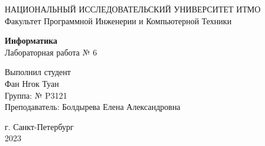 \pagestyle{main_title}  
\Large\begin{center}
    НАЦИОНАЛЬНЫЙ ИССЛЕДОВАТЕЛЬСКИЙ УНИВЕРСИТЕТ ИТМО \\
    Факультет Программной Инженерии и Компьютерной Техники
\end{center}
\vspace{250pt}
\begin{center}
\Large\textbf{Информатика} \\
Лабораторная работа № 6 \\ 
\end{center}
\vspace{70pt}
\hspace*{0pt}\hfill Выполнил студент \\
\hspace*{0pt}\hfill Фан Нгок Туан \\
\hspace*{0pt}\hfill Группа: № P3121 \\
\hspace*{0pt}\hfill Преподаватель: Болдырева Елена Александровна \\ 
\vspace{150pt}
\begin{center}
г. Санкт-Петербург \\
2023
\end{center}
\newpage